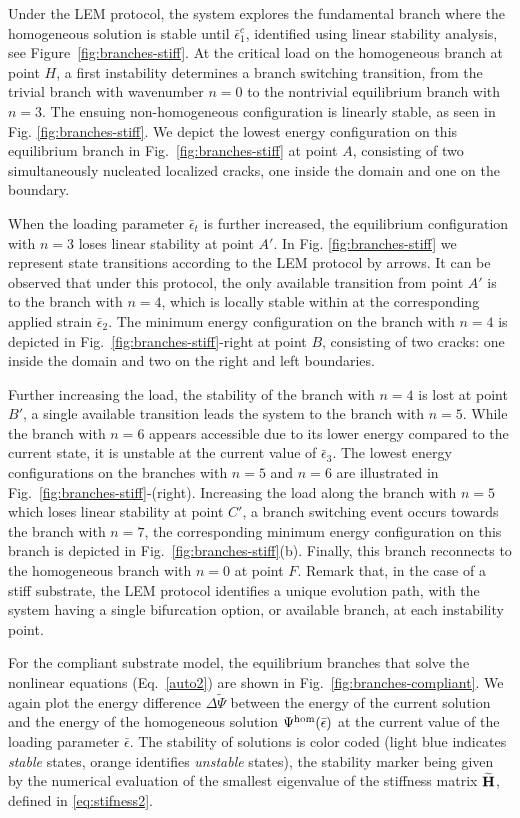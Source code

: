 \documentclass[10pt]{article}
\begin{document}
Under the LEM protocol, the system explores the fundamental branch where the homogeneous solution is stable until 
$\bar\epsilon^c_1$, identified using linear stability analysis, see Figure~\ref{fig:branches-stiff}. At the critical load on the homogeneous branch  at point $H$, a first instability determines a branch switching transition, from the trivial branch with wavenumber $n = 0$ to the nontrivial equilibrium branch with $n = 3$. The ensuing non-homogeneous configuration is linearly stable, as seen in Fig. \ref{fig:branches-stiff}. We depict the lowest energy configuration on this equilibrium branch in Fig.~\ref{fig:branches-stiff} at point $A$, consisting of two simultaneously nucleated localized cracks, one inside the domain and one on the boundary. 

When the loading parameter $\bar{\epsilon}_t$ is further increased, the equilibrium configuration with $n=3$ loses linear stability at point $A'$. In Fig. \ref{fig:branches-stiff} we represent state transitions according to the LEM protocol by arrows. It can be observed that under this protocol, the only available transition from point $A'$ is to the branch with $n=4$, which is locally stable within at the corresponding applied strain $\bar{\epsilon}_2$. The minimum energy configuration on the branch with $n=4$ is depicted in Fig.~\ref{fig:branches-stiff}-right at point $B$, consisting of two cracks: one inside the domain and two on the right and left boundaries.

Further increasing the load, the stability of the branch with $n=4$ is lost at point $B'$, a single available transition leads the system to the branch with $n=5$. While the branch with $n=6$ appears accessible due to its lower energy compared to the current state, it is unstable at the current value of $\bar\epsilon_3$. The lowest energy configurations on the branches with $n=5$ and $n=6$ are illustrated in Fig.~\ref{fig:branches-stiff}-(right). Increasing the load along the branch with $n=5$ which loses linear stability at point $C'$, a branch switching event occurs towards the branch with $n=7$, the corresponding minimum energy configuration on this branch is depicted in Fig.~\ref{fig:branches-stiff}(b). Finally, this branch reconnects to the homogeneous branch with $n=0$ at point $F$. Remark that, in the case of a stiff substrate, the LEM protocol identifies a unique evolution path, with the system having a single bifurcation option, or available branch, at each instability point.

For the compliant substrate model, the equilibrium branches that solve the nonlinear equations (Eq.~\ref{auto2}) are shown in Fig.~\ref{fig:branches-compliant}. 
We again plot the energy difference $\Delta \widetilde\Psi$ between the energy of the current solution and the energy of the homogeneous solution $\Psi^\text{hom} (\bar{\epsilon})$ at the current value of the loading parameter $\bar\epsilon$. 
The stability of solutions is color coded (light blue indicates \emph{stable} states, orange identifies \emph{unstable} states), the stability marker being given by the numerical evaluation of the smallest eigenvalue of the stiffness matrix $\widetilde{\mathbf{H}}$, defined in \eqref{eq:stifness2}.
\end{document}
